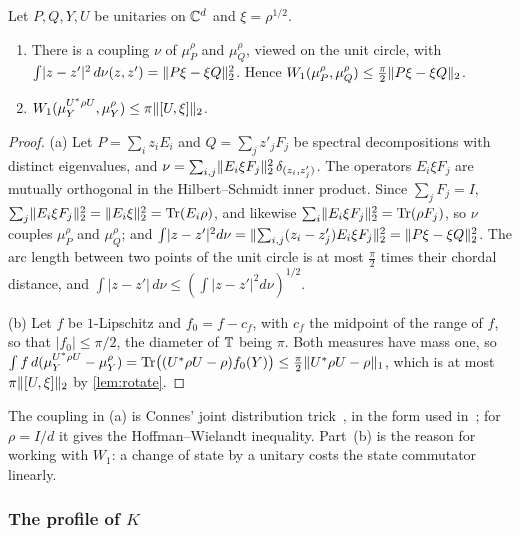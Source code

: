 \begin{lemma}\label{lem:coupling}
Let $P,Q,Y,U$ be unitaries on $\mathbb C^d$ and $\xi=\rho^{1/2}$.
\begin{enumerate}[label=(\alph*),itemsep=1pt]
\item There is a coupling $\nu$ of $\mu^\rho_P$ and $\mu^\rho_Q$, viewed on the unit circle, with $\int\lvert z-z'\rvert^2\,d\nu(z,z')=\lVert P\xi-\xi
Q\rVert_2^2$. Hence $W_1(\mu^\rho_P,\mu^\rho_Q)\le\frac\pi2\lVert P\xi-\xi Q\rVert_2$.
\item $W_1(\mu^{U^*\rho U}_Y,\mu^\rho_Y)\le\pi\lVert [U,\xi]\rVert_2$.
\end{enumerate}
\end{lemma}

\begin{proof}
(a) Let $P=\sum_iz_iE_i$ and $Q=\sum_jz'_jF_j$ be spectral decompositions with distinct eigenvalues, and
$\nu=\sum_{i,j}\lVert E_i\xi F_j\rVert_2^2\,\delta_{(z_i,z'_j)}$. The operators $E_i\xi F_j$ are mutually orthogonal in the Hilbert--Schmidt inner
product. Since $\sum_jF_j=I$, $\sum_j\lVert E_i\xi F_j\rVert_2^2=\lVert E_i\xi\rVert_2^2=\operatorname{Tr}(E_i\rho)$, and likewise $\sum_i\lVert E_i\xi F_j\rVert_2^2=\operatorname{Tr}(\rho F_j)$, so
$\nu$ couples $\mu^\rho_P$ and $\mu^\rho_Q$; and $\int\lvert z-z'\rvert^2d\nu=\lVert \sum_{i,j}(z_i-z'_j)E_i\xi F_j\rVert_2^2=\lVert P\xi-\xi Q\rVert_2^2$. The arc
length between two points of the unit circle is at most $\frac\pi2$ times their chordal distance, and $\int\lvert z-z'\rvert\,d\nu\le(\int\lvert
z-z'\rvert^2d\nu)^{1/2}$.

(b) Let $f$ be $1$-Lipschitz and $f_0=f-c_f$, with $c_f$ the midpoint of the range of $f$, so that $\lvert f_0\rvert\le\pi/2$, the diameter
of $\mathbb T$ being $\pi$. Both measures have mass one, so $\int f\,d(\mu^{U^*\rho U}_Y-\mu^\rho_Y)=\operatorname{Tr}\bigl((U^*\rho U-\rho)f_0(Y)\bigr)\le\frac\pi2\lVert U^*\rho
U-\rho\rVert_1$, which is at most $\pi\lVert [U,\xi]\rVert_2$ by \cref{lem:rotate}.
\end{proof}

The coupling in (a) is Connes' joint distribution trick~\cite[Lemma~1.2.6]{Con76}, in the form used in~\cite[Lemma~5.5]{SV18}; for
$\rho=I/d$ it gives the Hoffman--Wielandt inequality. Part~(b) is the reason for working with $W_1$: a change of state by a unitary costs
the state commutator linearly.

\subsubsection*{The profile of \texorpdfstring{$K$}{K}}

